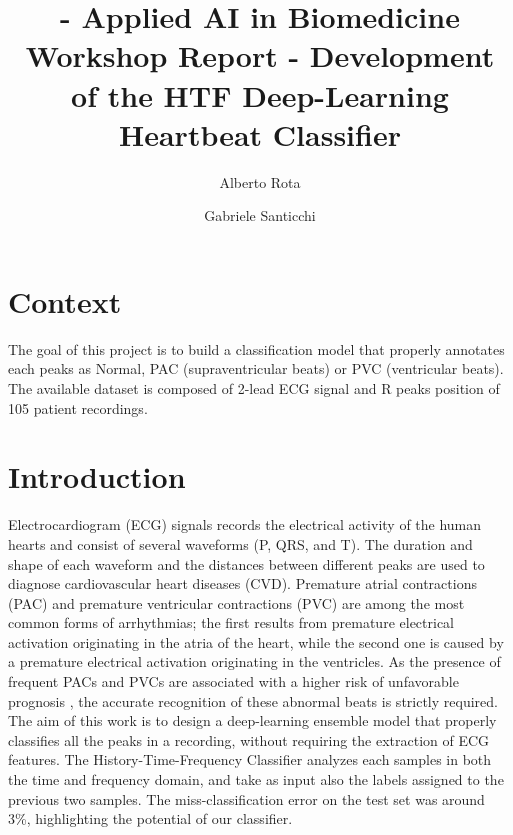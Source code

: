 \documentclass[conference]{IEEEtran}
\begin{document}
\title{ - Applied AI in Biomedicine Workshop Report - Development of the HTF Deep-Learning Heartbeat Classifier   }

\author{
    Alberto Rota
    \\
\and
    Gabriele Santicchi 
    }
\maketitle

\section{Context}
    The goal of this project is to build a classification model that
    properly annotates each peaks as Normal, PAC (supraventricular
    beats) or PVC (ventricular beats). The available dataset is
    composed of 2-lead ECG signal and R peaks position of 105 patient 
    recordings. 

\section{Introduction}
    Electrocardiogram (ECG) signals records the electrical activity of
    the human hearts and consist of several waveforms (P, QRS, and T).
    The duration and shape of each waveform and the distances between
    different peaks are used to diagnose cardiovascular heart diseases
    (CVD). Premature atrial contractions (PAC) and premature
    ventricular contractions (PVC) are among the most common forms of
    arrhythmias; the first results from premature electrical
    activation originating in the atria of the heart, while the second
    one is caused by a premature electrical activation originating in
    the ventricles. As the presence of frequent PACs and PVCs are
    associated with a higher risk of unfavorable prognosis \cite{relation_of}
    \cite{cardiac_mortality}, the accurate recognition of these abnormal beats 
    is strictly required.
    The aim of this work is to design a deep-learning ensemble
    model that properly classifies all the peaks in a recording,
    without requiring the extraction of ECG features. The
    History-Time-Frequency Classifier analyzes each samples in both
    the time and frequency domain, and take as input also the labels
    assigned to the previous two samples. The miss-classification
    error on the test set was around 3\%, highlighting the potential
    of our classifier. 
\end{document}
